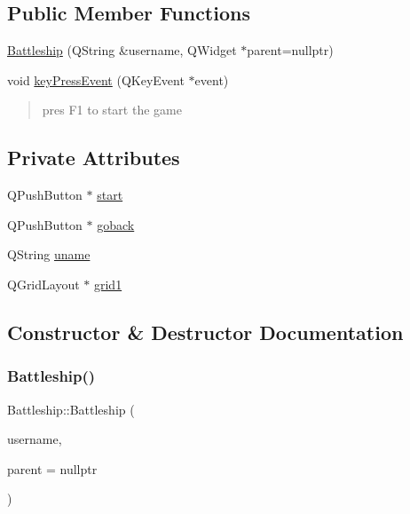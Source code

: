 \subsection*{Public Member Functions}
\begin{DoxyCompactItemize}
\item 
\hyperlink{classBattleship_afe1dd441643011f48c6e89c2c761f556}{Battleship} (Q\+String \&username, Q\+Widget $\ast$parent=nullptr)
\item 
void \hyperlink{classBattleship_a708a8b74e16ed2febd644e718445457a}{key\+Press\+Event} (Q\+Key\+Event $\ast$event)
\begin{DoxyCompactList}\small\item\em \begin{quote}
pres F1 to start the game \end{quote}
\end{DoxyCompactList}\end{DoxyCompactItemize}
\subsection*{Private Attributes}
\begin{DoxyCompactItemize}
\item 
Q\+Push\+Button $\ast$ \hyperlink{classBattleship_adac0fc24ec4d4edfc6aaad21b6ec314f}{start}
\item 
Q\+Push\+Button $\ast$ \hyperlink{classBattleship_a4480babf26efe4e44c6255b17021611f}{goback}
\item 
Q\+String \hyperlink{classBattleship_aef5c3590a84c0d99e00d67796ef578bb}{uname}
\item 
Q\+Grid\+Layout $\ast$ \hyperlink{classBattleship_a6c80b36f528440c9144085742fb218b6}{grid1}
\end{DoxyCompactItemize}


\subsection{Constructor \& Destructor Documentation}
\mbox{\label{classBattleship_afe1dd441643011f48c6e89c2c761f556}} 
\subsubsection{\texorpdfstring{Battleship()}{Battleship()}}
{\footnotesize\ttfamily Battleship\+::\+Battleship (\begin{DoxyParamCaption}\item[{Q\+String \&}]{username,  }\item[{Q\+Widget $\ast$}]{parent = {\ttfamily nullptr} }\end{DoxyParamCaption})\hspace{0.3cm}{\ttfamily [explicit]}}

